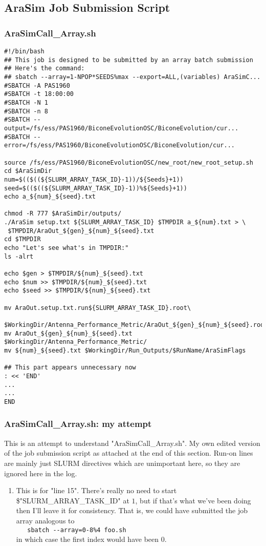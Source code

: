 \documentclass[12pt,letterpaper]{article}
\begin{document}
\subsection{AraSim Job Submission Script}

\subsubsection{AraSimCall\_Array.sh}
\begin{verbatim}
#!/bin/bash
## This job is designed to be submitted by an array batch submission
## Here's the command:
## sbatch --array=1-NPOP*SEEDS%max --export=ALL,(variables) AraSimC...
#SBATCH -A PAS1960
#SBATCH -t 18:00:00
#SBATCH -N 1
#SBATCH -n 8
#SBATCH --output=/fs/ess/PAS1960/BiconeEvolutionOSC/BiconeEvolution/cur...
#SBATCH --error=/fs/ess/PAS1960/BiconeEvolutionOSC/BiconeEvolution/cur...

source /fs/ess/PAS1960/BiconeEvolutionOSC/new_root/new_root_setup.sh
cd $AraSimDir
num=$(($((${SLURM_ARRAY_TASK_ID}-1))/${Seeds}+1)) 
seed=$(($((${SLURM_ARRAY_TASK_ID}-1))%${Seeds}+1))
echo a_${num}_${seed}.txt

chmod -R 777 $AraSimDir/outputs/
./AraSim setup.txt ${SLURM_ARRAY_TASK_ID} $TMPDIR a_${num}.txt > \
 $TMPDIR/AraOut_${gen}_${num}_${seed}.txt
cd $TMPDIR
echo "Let's see what's in TMPDIR:"
ls -alrt 

echo $gen > $TMPDIR/${num}_${seed}.txt
echo $num >> $TMPDIR/${num}_${seed}.txt
echo $seed >> $TMPDIR/${num}_${seed}.txt

mv AraOut.setup.txt.run${SLURM_ARRAY_TASK_ID}.root\
 $WorkingDir/Antenna_Performance_Metric/AraOut_${gen}_${num}_${seed}.root
mv AraOut_${gen}_${num}_${seed}.txt $WorkingDir/Antenna_Performance_Metric/
mv ${num}_${seed}.txt $WorkingDir/Run_Outputs/$RunName/AraSimFlags

## This part appears unnecessary now
: << 'END'
...
...
END
\end{verbatim}

\subsubsection{AraSimCall\_Array.sh: my attempt}
This is an attempt to understand "AraSimCall_Array.sh". My own edited version of
the job submission script as attached at the end of this section. Run-on lines
are mainly just SLURM directives which are unimportant here, so they are
ignored here in the log.
\begin{enumerate}
  \item This is for "line 15". 
    There's really no need to start \$"SLURM_ARRAY_TASK_ID" at $1$, but if that's 
    what we've been doing then I'll leave it for consistency.
    That is, we could have submitted the job array analogous to \\
      \verb|   sbatch --array=0-8%4 foo.sh| \\
    in which case the first index would have been $0$.
\end{enumerate}
\end{document}
